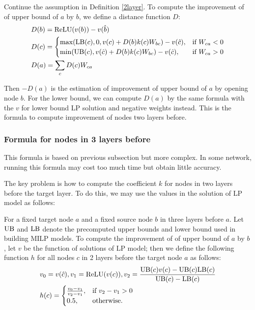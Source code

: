 \begin{definition}
	Continue the assumption in Definition \ref{2layer}. To compute the improvement of of upper bound of $a$ by $b$, we define a distance function $D$:
	\begin{align}
		&D(b) = \mathrm{ReLU}(v(b))-v(\hat{b})\\
			&D(c) =
		\begin{cases}
			\max(\mathrm{LB}(c), 0, v(c)+D(b)k(c)W_{bc})-v(\hat{c}), & \text{if }W_{ca} < 0\\
			\min(\mathrm{UB}(c), v(\hat{c})+D(b)k(c)W_{bc})-v(\hat{c}), & \text{if }  W_{ca} > 0
		\end{cases}\\
		&D(a) = \sum_c D(c)W_{ca}
	\end{align}
\end{definition}

Then $-D(a)$ is the estimation of improvement of upper bound of $a$ by opening node $b$. For the lower bound, we can compute $D(a)$ by the same formula with the $v$ for lower bound LP solution and negative weights instead. This is the formula to compute improvement of nodes two layers before.


\subsubsection*{Formula for nodes in 3 layers before} 

This formula is based on previous subsection but more complex. In some network, running this formula may cost too much time but obtain little accuracy. 

The key problem is how to compute the coefficient $k$ for nodes in two layers before the target layer. To do this, we may use the values in the solution of LP model as follows:

\begin{definition}\label{3layer}
	For a fixed target node $a$ and a fixed source node $b$ in three layers before $a$. Let $\mathrm{UB}$ and $\mathrm{LB}$ denote the precomputed upper bounds and lower bound used in building MILP models. To compute the improvement of of upper bound of $a$ by $b$, let $v$ be the function of solutions of LP model; then we define the following function $h$ for all nodes $c$ in 2 layers before the target node $a$ as follows:
	\begin{align}
		&v_0 = v(\hat{c}), v_1 = \mathrm{ReLU}(v(c)), v_2 = \frac{\mathrm{UB}(c)v(c)-\mathrm{UB}(c)\mathrm{LB}(c)}{\mathrm{UB}(c)-\mathrm{LB}(c)}\\
		&h(c) =
		\begin{cases}
			\frac{v_0-v_1}{v_2-v_1}, & \text{if } v_2-v_1 > 0\\
			0.5, & \text{otherwise.}
		\end{cases}
	\end{align} 
\end{definition} 

